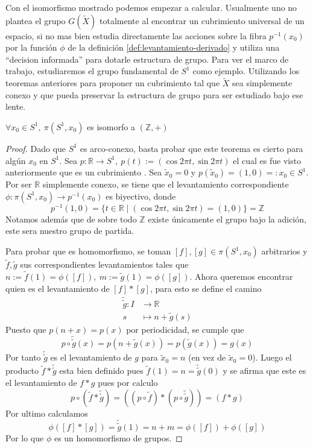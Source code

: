 Con el isomorfismo mostrado podemos empezar a calcular. Usualmente uno
no plantea el grupo \(G (\tilde X)\) totalmente al encontrar un
cubrimiento universal de un espacio, si no mas bien estudia directamente
las acciones sobre la fibra \(p^{-1} (x_0)\) por la función
\(\phi\) de la definición \ref{def:levantamiento-derivado} y utiliza una
``decision informada'' para dotarle estructura de grupo. Para ver el
marco de trabajo, estudiaremos el grupo fundamental de \(S^1\) como
ejemplo. Utilizando los teoremas anteriores para proponer un
cubrimiento tal que \(\tilde X\) sea simplemente conexo y que pueda
preservar la estructura de grupo para ser estudiado bajo ese lente.
\begin{teorema} \label{thm:grupo-S1}
  \(\forall x_0 \in S^1,\ \pi (S^1,x_0)\) es isomorfo a \((\mathbb Z, +)\)
\end{teorema}
\begin{proof}
  Dado que \(S^1\) es arco-conexo, basta probar que este teorema es
  cierto para algún \(x_0\) en \(S^1\). Sea \(p : \mathbb R \to S^1,\
  p(t) := (\cos 2 \pi t, \sin 2 \pi t)\) el cual es fue visto anteriormente
  que es un cubrimiento . Sea \(\tilde x _0 = 0\) y \( p(\tilde x _0) =
  (1,0) =: x_0 \in S^1\). Por ser \(\mathbb R\) simplemente conexo, se
  tiene que el levantamiento correspondiente \(\phi : \pi (S^1, x_0) \to
  p^{-1} (x_0)\) es biyectivo, donde
  \[ p^{-1} (1,0) = \{t \in \mathbb R \mid (\cos 2 \pi t, \sin 2 \pi t)
    = (1, 0) \} = \mathbb Z \]
  Notamos además que de sobre todo \(\mathbb Z\) existe únicamente el
  grupo bajo la adición, este sera nuestro grupo de partida.

  Para probar que es homomorfismo, se toman \([f], [g] \in \pi
  (S^1, x_0)\) arbitrarios y \(\tilde f, \tilde g\) sus correspondientes
  levantamientos tales que \(n := \tilde f (1) = \phi ([f]),\ m :=
  \tilde g (1) = \phi ([g])\). Ahora queremos encontrar quien es el
  levantamiento de \([f] * [g]\), para esto se define el camino
  \begin{align*}
    \tilde{\tilde g} : I &\longrightarrow \mathbb R \\
    s &\longmapsto n + \tilde g (s)
  \end{align*}
  Puesto que \(p(n + x) = p(x)\) por periodicidad, se cumple que
  \[ p \circ \tilde{\tilde g} (x) = p (n + \tilde g (x)) = p (\tilde g
    (x)) = g (x) \]
  Por tanto \(\tilde{\tilde g}\) es el levantamiento de \(g\) para
  \(\tilde x_0 = n\) (en vez de \(\tilde x_0 = 0\)). Luego el producto
  \(\tilde f * \tilde{\tilde g}\) esta bien definido pues \(\tilde f (1)
  = n = \tilde{\tilde g} (0)\) y se afirma que este es el levantamiento
  de \(f * g\) pues por calculo
  \[ p \circ (\tilde f * \tilde{\tilde g}) =
     ((p \circ \tilde f) * (p \circ \tilde{\tilde g})) =
     (f * g)
  \]
  Por ultimo calculamos
  \[ \phi ([f] * [g]) = \tilde{\tilde g} (1) = n + m = \phi ([f]) + \phi
  ([g]) \]
  Por lo que \(\phi\) es un homomorfismo de grupos.
\end{proof}

